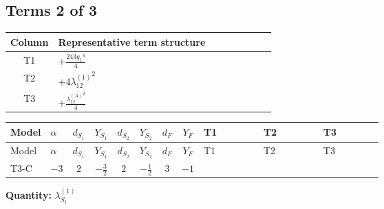 \documentclass[8pt]{article}
\begin{document}
\begin{landscape}
\subsection*{Terms 2 of 3}
\begin{center}
\begin{tabular}{@{}c >{\raggedright\arraybackslash}p{0.82\linewidth}@{}}
\toprule
Column & Representative term structure \\
\midrule
T1 & \(\displaystyle +\frac{243 {g_1}^4}{4}\) \\
\midrule
T2 & \(\displaystyle +4 {\lambda_{12}^{(1)}}^2\) \\
\midrule
T3 & \(\displaystyle +\frac{{\lambda_{12}^{(A)}}^2}{4}\) \\
\midrule
\bottomrule
\end{tabular}
\end{center}
\smallskip
\tiny
\begin{longtable}{@{}llcccccc >{\raggedright\arraybackslash}p{0.21\linewidth} >{\raggedright\arraybackslash}p{0.21\linewidth} >{\raggedright\arraybackslash}p{0.21\linewidth}@{}}
\toprule
Model & $\alpha$ & $d_{S_1}$ & $Y_{S_1}$ & $d_{S_2}$ & $Y_{S_2}$ & $d_F$ & $Y_F$ & T1 & T2 & T3 \\
\midrule
\endfirsthead
\toprule
Model & $\alpha$ & $d_{S_1}$ & $Y_{S_1}$ & $d_{S_2}$ & $Y_{S_2}$ & $d_F$ & $Y_F$ & T1 & T2 & T3 \\
\midrule
\endhead
T3-C & $-3$ & $2$ & $-\frac{3}{2}$ & $2$ & $-\frac{1}{2}$ & $3$ & $-1$ & \scriptsize\adjustbox{max width=\linewidth}{$\begin{gathered} +\frac{243 {g_1}^4}{4}\end{gathered}$} & \scriptsize\adjustbox{max width=\linewidth}{$\begin{gathered} +4 {\lambda_{12}^{(1)}}^2\end{gathered}$} & \scriptsize\adjustbox{max width=\linewidth}{$\begin{gathered} +\frac{{\lambda_{12}^{(A)}}^2}{4}\end{gathered}$} \\
\midrule
\bottomrule
\end{longtable}
\clearpage
\noindent\textbf{Quantity: }$\lambda_{S_1}^{(1)}$\par\smallskip

\end{landscape}
\end{document}
